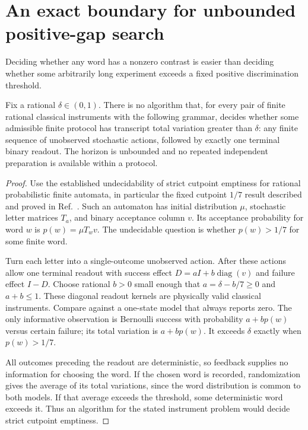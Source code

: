 \section{An exact boundary for unbounded positive-gap search}

Deciding whether any word has a nonzero contrast is easier than deciding
whether some arbitrarily long experiment exceeds a fixed positive
discrimination threshold.

\begin{theorem}
\label{finite:undecidable}
Fix a rational $\delta\in(0,1)$. There is no algorithm that, for every
pair of finite rational classical instruments with the following grammar,
decides whether some admissible finite protocol has transcript total
variation greater than $\delta$: any finite sequence of unobserved
stochastic actions, followed by exactly one terminal binary readout.
The horizon is unbounded and no repeated independent preparation is
available within a protocol.
\end{theorem}
\begin{proof}
Use the established undecidability of strict cutpoint emptiness for
rational probabilistic finite automata, in particular the fixed cutpoint
$1/7$ result described and proved in Ref.~\cite{f_rote}. Such an automaton
has initial distribution $\mu$, stochastic letter matrices $T_a$, and
binary acceptance column $v$. Its acceptance probability for word $w$ is
$p(w)=\mu T_wv$. The undecidable question is whether $p(w)>1/7$ for some
finite word.

Turn each letter into a single-outcome unobserved action. After these
actions allow one terminal readout with success effect
$D=aI+b\operatorname{diag}(v)$ and failure effect $I-D$. Choose rational
$b>0$ small enough that $a=\delta-b/7\geq0$ and $a+b\leq1$. These
diagonal readout kernels are physically valid classical instruments.
Compare against a one-state model that always reports zero. The only
informative observation is Bernoulli success with probability
$a+bp(w)$ versus certain failure; its total variation is $a+bp(w)$.
It exceeds $\delta$ exactly when $p(w)>1/7$.

All outcomes preceding the readout are deterministic, so feedback supplies
no information for choosing the word. If the chosen word is recorded,
randomization gives the average of its total variations, since the word
distribution is common to both models. If that average exceeds the
threshold, some deterministic word exceeds it. Thus an algorithm for
the stated instrument problem would decide strict cutpoint emptiness.
\end{proof}

